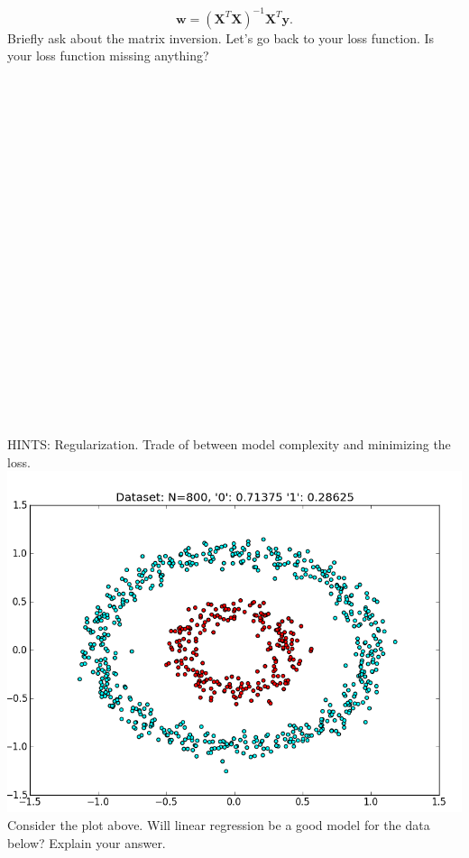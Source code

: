 \documentclass{article}
\begin{document}
\\ \\ \\ \\ \\ \\ \\ \\ \\ \\ \\
\\ \\ \\ \\ \\ \\ \\ \\ \\ \\ \\
\[
		\textbf{w} = {(\textbf{X}^T\textbf{X})}^{-1} \textbf{X}^T\textbf{y}.
\]
Briefly ask about the matrix inversion.
\vspace{3cm} 
\newpage
Let's go back to your loss function.  Is your loss function missing anything?
\\ \\ \\ \\ \\ \\ \\ \\ \\ \\ \\
\\ \\ \\ \\ \\ \\ \\ \\ \\ \\ \\

HINTS:  Regularization.  Trade of between model complexity and minimizing the loss.
\newpage
\includegraphics[width=\textwidth]{dataset_nonsep}
Consider the plot above.  Will linear regression be a good model for the data below?  Explain your answer.
\end{document}
